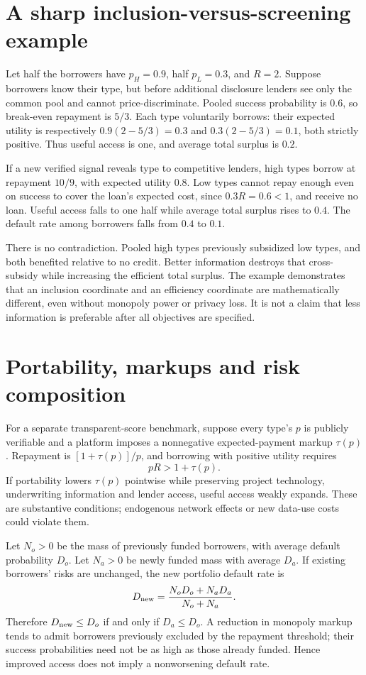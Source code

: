 \documentclass[11pt]{article}
\begin{document}
\section*{A sharp inclusion-versus-screening example}
Let half the borrowers have $p_H=0.9$, half $p_L=0.3$, and $R=2$. Suppose borrowers know their type, but before additional disclosure lenders see only the common pool and cannot price-discriminate. Pooled success probability is $0.6$, so break-even repayment is $5/3$. Each type voluntarily borrows: their expected utility is respectively $0.9(2-5/3)=0.3$ and $0.3(2-5/3)=0.1$, both strictly positive. Thus useful access is one, and average total surplus is $0.2$.

If a new verified signal reveals type to competitive lenders, high types borrow at repayment $10/9$, with expected utility $0.8$. Low types cannot repay enough even on success to cover the loan's expected cost, since $0.3R=0.6<1$, and receive no loan. Useful access falls to one half while average total surplus rises to $0.4$. The default rate among borrowers falls from $0.4$ to $0.1$.

There is no contradiction. Pooled high types previously subsidized low types, and both benefited relative to no credit. Better information destroys that cross-subsidy while increasing the efficient total surplus. The example demonstrates that an inclusion coordinate and an efficiency coordinate are mathematically different, even without monopoly power or privacy loss. It is not a claim that less information is preferable after all objectives are specified.

\section*{Portability, markups and risk composition}
For a separate transparent-score benchmark, suppose every type's $p$ is publicly verifiable and a platform imposes a nonnegative expected-payment markup $\tau(p)$. Repayment is $[1+\tau(p)]/p$, and borrowing with positive utility requires
\[
 pR>1+\tau(p).
\]
If portability lowers $\tau(p)$ pointwise while preserving project technology, underwriting information and lender access, useful access weakly expands. These are substantive conditions; endogenous network effects or new data-use costs could violate them.

Let $N_o>0$ be the mass of previously funded borrowers, with average default probability $D_o$. Let $N_a>0$ be newly funded mass with average $D_a$. If existing borrowers' risks are unchanged, the new portfolio default rate is
\[
 D_{\rm new}=\frac{N_oD_o+N_aD_a}{N_o+N_a}.
\]
Therefore $D_{\rm new}\leq D_o$ if and only if $D_a\leq D_o$. A reduction in monopoly markup tends to admit borrowers previously excluded by the repayment threshold; their success probabilities need not be as high as those already funded. Hence improved access does not imply a nonworsening default rate.
\end{document}
